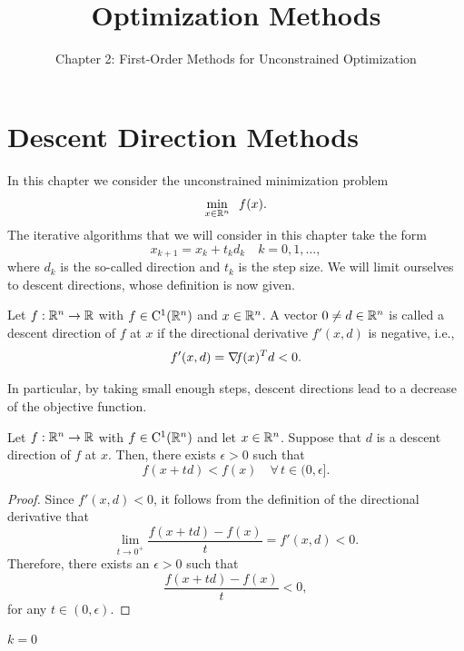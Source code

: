 \documentclass[10pt,a4paper]{article}
\title{Optimization Methods}
\author{Chapter 2: First-Order Methods for Unconstrained Optimization}
\date{}
\begin{document}
	\maketitle
	\section{Descent Direction Methods}
	\noindent In this chapter we consider the unconstrained minimization problem
	\begin{equation*}
		\min_{x\in\mathbb{R}^n} \;\; f(x).
	\end{equation*}
The iterative algorithms that we will consider in this chapter take the form
\begin{equation*}
	x_{k+1} = x_k +t_k d_k \quad k=0,1, \dots,
\end{equation*}
where $d_k$ is the so-called direction and $t_k$ is the step size. We will limit ourselves to descent
directions, whose definition is now given.
\begin{definition}
	Let $f:\mathbb{R}^n\to\mathbb{R}$ with $f\in\mathord{\mathrm{C^1}}(\mathbb{R}^n)$ and $x\in \mathbb{R}^n$. A vector $0\neq d\in \mathbb{R}^n$ is called a descent direction of $f$ at $x$ if the directional derivative $f'(x,d)$ is negative, i.e., 
	\begin{equation*}
		f'(x,d)= \operatorname*{\mathit{\nabla \!f}}(x)^T d < 0.
	\end{equation*}
\end{definition}
\noindent In particular, by taking small enough steps, descent directions lead to a decrease of the objective function.
\begin{lemma}
	Let $f:\mathbb{R}^n\to\mathbb{R}$ with $f\in\mathord{\mathrm{C^1}}(\mathbb{R}^n)$ and let $x\in \mathbb{R}^n$. Suppose that $d$ is a descent direction of $f$ at $x$. Then, there exists $\epsilon>0$ such that 
	\begin{equation*}
		f(x+td) < f(x) \quad \forall \, t \in (0,\epsilon].
	\end{equation*} 
\end{lemma}
\begin{proof}
	Since $f'(x,d)<0$, it follows from the definition of the directional derivative that 
	\begin{equation*}
		\lim_{t\to 0^+}\frac{f(x+td)-f(x)}{t} = f'(x,d) <0.
	\end{equation*}
Therefore, there exists an $\epsilon>0$ such that 
\begin{equation*}
	\frac{f(x+td)-f(x)}{t}<0,
\end{equation*}
for any $t\in(0,\epsilon)$.
\end{proof}
\begin{algorithm}[H]\label{alg}
	\caption{Schematic Descent Directions Method}
	
	
	$k = 0$
	
\end{algorithm}
\end{document}
